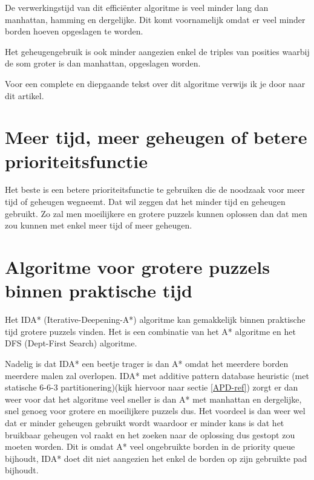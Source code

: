 \documentclass{article}
\begin{document}
De verwerkingstijd van dit effici\"{e}nter algoritme is veel minder lang dan manhattan, hamming en dergelijke. Dit komt voornamelijk omdat er veel minder borden hoeven opgeslagen te worden.

Het geheugengebruik is ook minder aangezien enkel de triples van posities waarbij de som groter is dan manhattan, opgeslagen worden.\cite{APD}

Voor een complete en diepgaande tekst over dit algoritme verwijs ik je door naar dit artikel.\cite{APD}

\section{Meer tijd, meer geheugen of betere prioriteitsfunctie}
Het beste is een betere prioriteitsfunctie te gebruiken die de noodzaak voor meer tijd of geheugen wegneemt. Dat wil zeggen dat het minder tijd en geheugen gebruikt. Zo zal men moeilijkere en grotere puzzels kunnen oplossen dan dat men zou kunnen met enkel meer tijd of meer geheugen.

\section{Algoritme voor grotere puzzels binnen praktische tijd}

Het IDA* (Iterative-Deepening-A*) algoritme kan gemakkelijk binnen praktische tijd grotere puzzels vinden. Het is een combinatie van het A* algoritme en het DFS (Dept-First Search) algoritme.

Nadelig is dat IDA* een beetje trager is dan A* omdat het meerdere borden meerdere malen zal overlopen. IDA* met additive pattern database heuristic (met statische 6-6-3 partitionering)(kijk hiervoor naar sectie \ref{APD-ref}) zorgt er dan weer voor dat het algoritme veel sneller is dan A* met manhattan en dergelijke, snel genoeg voor grotere en moeilijkere puzzels dus.
Het voordeel is dan weer wel dat er minder geheugen gebruikt wordt waardoor er minder kans is dat het bruikbaar geheugen vol raakt en het zoeken naar de oplossing dus gestopt zou moeten worden. Dit is omdat A* veel ongebruikte borden in de priority queue bijhoudt, IDA* doet dit niet aangezien het enkel de borden op zijn gebruikte pad bijhoudt.



\end{document}
